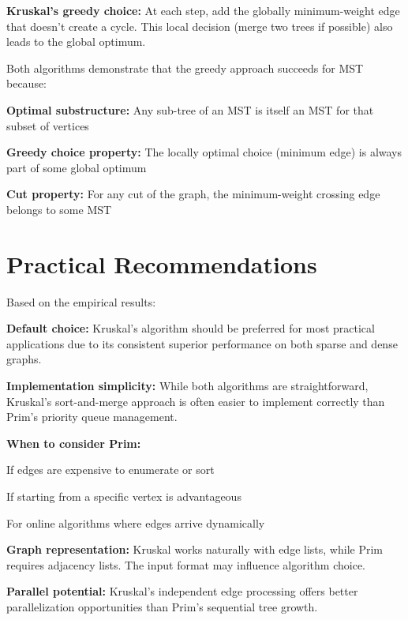 \documentclass[12pt, a4paper]{report}
\begin{document}
\textbf{Kruskal's greedy choice:} At each step, add the globally minimum-weight edge that doesn't create a cycle. This local decision (merge two trees if possible) also leads to the global optimum.

Both algorithms demonstrate that the greedy approach succeeds for MST because:

\begin{dashenum}
  \item \textbf{Optimal substructure:} Any sub-tree of an MST is itself an MST for that subset of vertices
  \item \textbf{Greedy choice property:} The locally optimal choice (minimum edge) is always part of some global optimum
  \item \textbf{Cut property:} For any cut of the graph, the minimum-weight crossing edge belongs to some MST
\end{dashenum}

\section{Practical Recommendations}

Based on the empirical results:

\begin{dashenum}
  \item \textbf{Default choice:} Kruskal's algorithm should be preferred for most practical applications due to its consistent superior performance on both sparse and dense graphs.
  
  \item \textbf{Implementation simplicity:} While both algorithms are straightforward, Kruskal's sort-and-merge approach is often easier to implement correctly than Prim's priority queue management.
  
  \item \textbf{When to consider Prim:}
    \begin{letterenum}
      \item If edges are expensive to enumerate or sort
      \item If starting from a specific vertex is advantageous
      \item For online algorithms where edges arrive dynamically
    \end{letterenum}
  
  \item \textbf{Graph representation:} Kruskal works naturally with edge lists, while Prim requires adjacency lists. The input format may influence algorithm choice.
  
  \item \textbf{Parallel potential:} Kruskal's independent edge processing offers better parallelization opportunities than Prim's sequential tree growth.
\end{dashenum}
\end{document}
